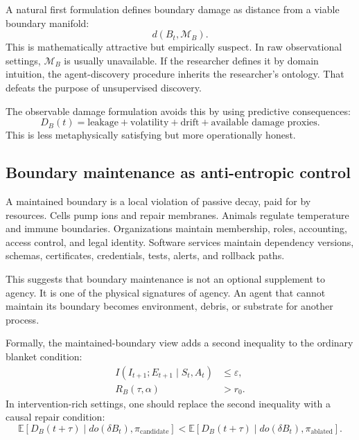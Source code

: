 \documentclass[11pt]{article}
\newcommand{\E}{\mathbb{E}}
\newcommand{\MI}{I}
\newcommand{\given}{\mid}
\begin{document}
A natural first formulation defines boundary damage as distance from a viable boundary manifold:
\begin{equation}
  d(B_t,\mathcal{M}_B).
\end{equation}
This is mathematically attractive but empirically suspect. In raw observational settings, $\mathcal{M}_B$ is usually unavailable. If the researcher defines it by domain intuition, the agent-discovery procedure inherits the researcher's ontology. That defeats the purpose of unsupervised discovery.

The observable damage formulation avoids this by using predictive consequences:
\begin{equation}
  D_B(t)
  =
  \text{leakage}
  +
  \text{volatility}
  +
  \text{drift}
  +
  \text{available damage proxies}.
\end{equation}
This is less metaphysically satisfying but more operationally honest.

\subsection{Boundary maintenance as anti-entropic control}

A maintained boundary is a local violation of passive decay, paid for by resources. Cells pump ions and repair membranes. Animals regulate temperature and immune boundaries. Organizations maintain membership, roles, accounting, access control, and legal identity. Software services maintain dependency versions, schemas, certificates, credentials, tests, alerts, and rollback paths.

This suggests that boundary maintenance is not an optional supplement to agency. It is one of the physical signatures of agency. An agent that cannot maintain its boundary becomes environment, debris, or substrate for another process.

Formally, the maintained-boundary view adds a second inequality to the ordinary blanket condition:
\begin{align}
  \MI(I_{t+1};E_{t+1}\given S_t,A_t) &\leq \varepsilon,
  \\
  R_B(\tau,\alpha) &> r_0.
\end{align}
In intervention-rich settings, one should replace the second inequality with a causal repair condition:
\begin{equation}
  \E[D_B(t+\tau)\given do(\delta B_t),\pi_{\mathrm{candidate}}]
  <
  \E[D_B(t+\tau)\given do(\delta B_t),\pi_{\mathrm{ablated}}].
\end{equation}
\end{document}
